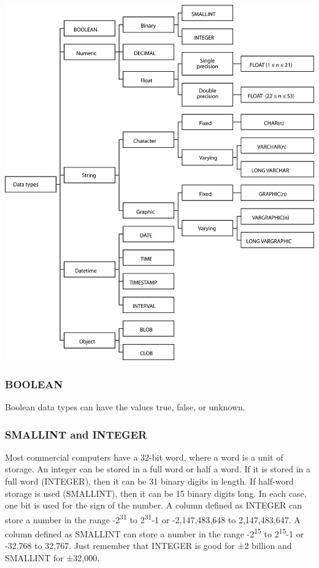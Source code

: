 \documentclass[
]{article}
\begin{document}
\includegraphics{Figures/Chapter 10/data types.png}

\hypertarget{boolean}{%
\subsubsection*{BOOLEAN}\label{boolean}}

Boolean data types can have the values true, false, or unknown.

\hypertarget{smallint-and-integer}{%
\subsubsection*{SMALLINT and INTEGER}\label{smallint-and-integer}}

Most commercial computers have a 32-bit word, where a word is a unit of
storage. An integer can be stored in a full word or half a word. If it
is stored in a full word (INTEGER), then it can be 31 binary digits in
length. If half-word storage is used (SMALLINT), then it can be 15
binary digits long. In each case, one bit is used for the sign of the
number. A column defined as INTEGER can store a number in the range
-2\textsuperscript{31} to 2\textsuperscript{31}-1 or -2,147,483,648 to
2,147,483,647. A column defined as SMALLINT can store a number in the
range -2\textsuperscript{15} to 2\textsuperscript{15}-1 or -32,768 to
32,767. Just remember that INTEGER is good for ±2 billion and SMALLINT
for ±32,000.
\end{document}
